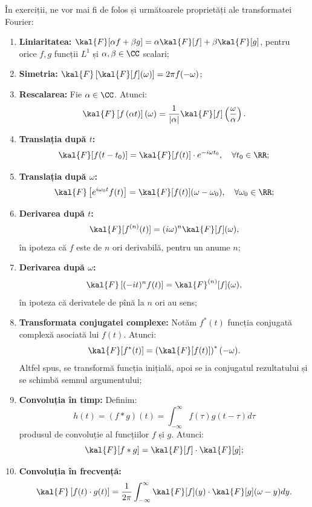 În exerciții, ne vor mai fi de folos și următoarele proprietăți ale
transformatei Fourier:
\begin{enumerate}[(1)]
\item \textbf{Liniaritatea:} $ \kal{F}[\alpha f + \beta g] = \alpha \kal{F}[f] + \beta \kal{F}[g] $,
  pentru orice $ f, g $ funcții $ L^1 $ și $ \alpha, \beta \in \CC $ scalari;
\item \textbf{Simetria:} $ \kal{F}\left[\kal{F}[f](\omega)\right] = 2\pi f(-\omega) $;
\item \textbf{Rescalarea:} Fie $ \alpha \in \CC $. Atunci:
  \[
    \kal{F}\left[f\left(\alpha t\right)\right](\omega) = %
    \dfrac{1}{|\alpha|}\kal{F}[f]\left(\dfrac{\omega}{\alpha}\right).
  \]
\item \textbf{Translația după $ t $:}
  \[
    \kal{F}[f(t - t_0)] = \kal{F}[f(t)] \cdot e^{-i\omega t_0}, %
    \quad \forall t_0 \in \RR;
  \]
\item \textbf{Translația după $ \omega $:}
  \[
    \kal{F}\left[e^{i\omega_0 t}f(t)\right] = \kal{F}[f(t)](\omega - \omega_0), %
    \quad \forall \omega_0 \in \RR;
  \]
\item \textbf{Derivarea după $ t $:}
  \[
    \kal{F}[f^{(n)}(t)] = (i\omega)^n \kal{F}[f](\omega),
  \]
  în ipoteza că $ f $ este de $ n $ ori derivabilă, pentru un anume $ n $;
\item \textbf{Derivarea după $ \omega $:}
  \[
    \kal{F}\left[(-it)^n f(t)\right] = \kal{F}^{(n)}[f](\omega),
  \]
  în ipoteza că derivatele de pînă la $ n $ ori au sens;
\item \textbf{Transformata conjugatei complexe:} Notăm $ f^\ast(t) $ funcția
  conjugată complexă asociată lui $ f(t) $. Atunci:
  \[
    \kal{F}[f^\ast(t)] = \left(\kal{F}[f(t)]\right)^\ast(-\omega).
  \]
  Altfel spus, se transformă funcția inițială, apoi se ia conjugatul
  rezultatului și se schimbă semnul argumentului;
\item \textbf{Convoluția în timp:} Definim:
  \[
    h(t) = (f \ast g)(t) = \int_{-\infty}^\infty f(\tau)g(t - \tau)d\tau
  \]
  produsul de convoluție al funcțiilor $ f $ și $ g $.
  Atunci:
  \[
    \kal{F}[f \ast g] = \kal{F}[f] \cdot \kal{F}[g];
  \]
\item \textbf{Convoluția în frecvență:}
  \[
    \kal{F}\left[f(t) \cdot g(t)\right] = %
    \dfrac{1}{2 \pi} \int_{-\infty}^\infty \kal{F}[f](y) \cdot \kal{F}[g](\omega - y)dy.
  \]
\end{enumerate}

